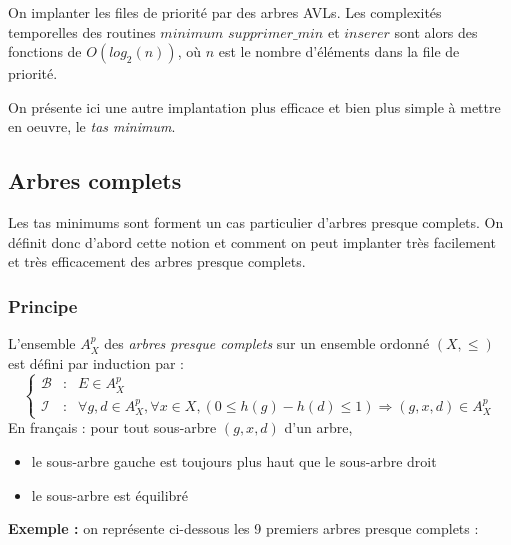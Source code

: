 \documentclass[../../../main.tex]{subfiles}
\begin{document}
On implanter les files de priorité par des arbres AVLs. Les complexités temporelles des routines $minimum$ $supprimer\_min$ et $inserer$ sont alors des fonctions de $O(log_2(n))$, où $n$ est le nombre d'éléments dans la file de priorité.

On présente ici une autre implantation plus efficace et bien plus simple à mettre en oeuvre, le \textit{tas minimum}.
\subsection{Arbres complets}
Les tas minimums sont forment un cas particulier d'arbres presque complets. On définit donc d'abord cette notion et comment on peut implanter très facilement et très efficacement des arbres presque complets.
\subsubsection{Principe}
 {
	L'ensemble $A^p_X$ des \textit{arbres presque complets} sur un ensemble ordonné $(X, \leq)$ est défini par induction par :
	$$\left\{\begin{array}{cll}
	\mathcal{B} & : & E\in A^p_X \\
	\mathcal{I} & : & \forall g, d\in A^p_X, \forall x\in X, (0 \leq h(g) - h(d) \leq 1) \Rightarrow (g, x, d)\in A^p_X
\end{array}\right.$$
	En français : pour tout sous-arbre $(g, x, d)$ d'un arbre,
	\begin{itemize}
		\item le sous-arbre gauche est toujours plus haut que le sous-arbre droit
		\item le sous-arbre est équilibré
	\end{itemize}
}
\textbf{Exemple :} on représente ci-dessous les 9 premiers arbres presque complets :
\end{document}
